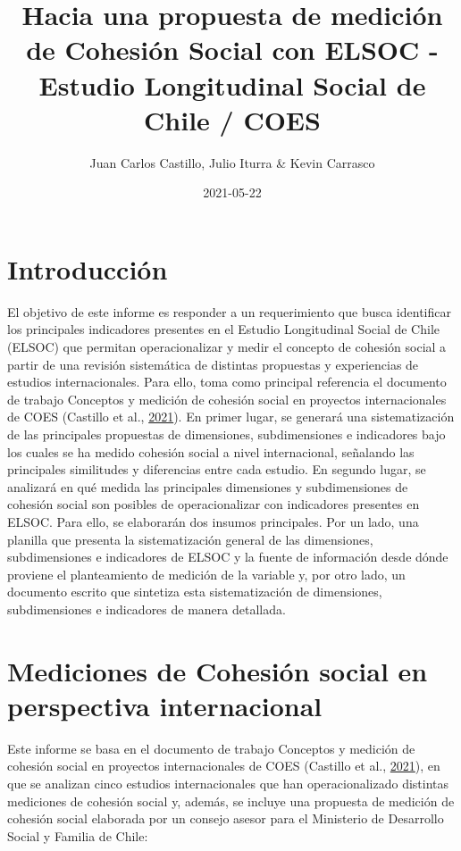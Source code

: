 \documentclass[
  12pt,
]{book}
\title{Hacia una propuesta de medición de Cohesión Social con ELSOC - Estudio Longitudinal Social de Chile / COES}
\author{Juan Carlos Castillo, Julio Iturra \& Kevin Carrasco}
\date{2021-05-22}
\begin{document}
\maketitle

{
\hypersetup{linkcolor=}
\setcounter{tocdepth}{1}
\tableofcontents
}
\listoftables
\listoffigures
{}
\hypertarget{introducciuxf3n}{%
\chapter{Introducción}\label{introducciuxf3n}}

El objetivo de este informe es responder a un requerimiento que busca identificar los principales indicadores presentes en el Estudio Longitudinal Social de Chile (ELSOC) que permitan operacionalizar y medir el concepto de cohesión social a partir de una revisión sistemática de distintas propuestas y experiencias de estudios internacionales. Para ello, toma como principal referencia el documento de trabajo Conceptos y medición de cohesión social en proyectos internacionales de COES (Castillo et al., \protect\hyperlink{ref-castillo_Conceptos_2021}{2021}). En primer lugar, se generará una sistematización de las principales propuestas de dimensiones, subdimensiones e indicadores bajo los cuales se ha medido cohesión social a nivel internacional, señalando las principales similitudes y diferencias entre cada estudio. En segundo lugar, se analizará en qué medida las principales dimensiones y subdimensiones de cohesión social son posibles de operacionalizar con indicadores presentes en ELSOC. Para ello, se elaborarán dos insumos principales. Por un lado, una planilla que presenta la sistematización general de las dimensiones, subdimensiones e indicadores de ELSOC y la fuente de información desde dónde proviene el planteamiento de medición de la variable y, por otro lado, un documento escrito que sintetiza esta sistematización de dimensiones, subdimensiones e indicadores de manera detallada.

\hypertarget{mediciones-de-cohesiuxf3n-social-en-perspectiva-internacional}{%
\chapter{Mediciones de Cohesión social en perspectiva internacional}\label{mediciones-de-cohesiuxf3n-social-en-perspectiva-internacional}}

Este informe se basa en el documento de trabajo Conceptos y medición de cohesión social en proyectos internacionales de COES (Castillo et al., \protect\hyperlink{ref-castillo_Conceptos_2021}{2021}), en que se analizan cinco estudios internacionales que han operacionalizado distintas mediciones de cohesión social y, además, se incluye una propuesta de medición de cohesión social elaborada por un consejo asesor para el Ministerio de Desarrollo Social y Familia de Chile:
\end{document}
